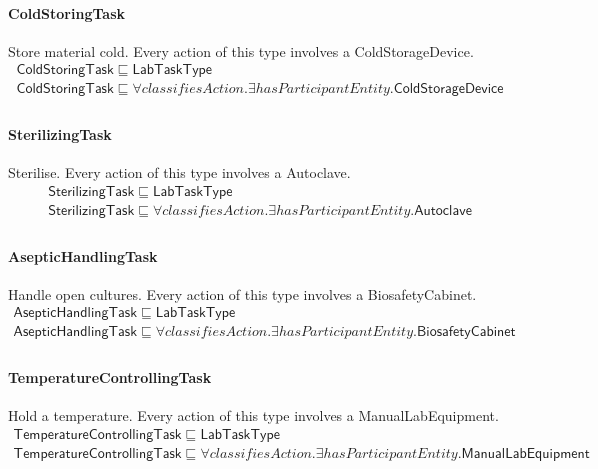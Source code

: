 \documentclass[10pt]{article}
\begin{document}
\paragraph{ColdStoringTask} Store material cold. Every action of this type involves a ColdStorageDevice.
\[\begin{array}{l}
\mathsf{ColdStoringTask} \sqsubseteq  \mathsf{LabTaskType} \\
\mathsf{ColdStoringTask} \sqsubseteq  \forall \mathit{classifiesAction}.\exists \mathit{hasParticipantEntity}.\mathsf{ColdStorageDevice} \\
\end{array}\]
\paragraph{SterilizingTask} Sterilise. Every action of this type involves a Autoclave.
\[\begin{array}{l}
\mathsf{SterilizingTask} \sqsubseteq  \mathsf{LabTaskType} \\
\mathsf{SterilizingTask} \sqsubseteq  \forall \mathit{classifiesAction}.\exists \mathit{hasParticipantEntity}.\mathsf{Autoclave} \\
\end{array}\]
\paragraph{AsepticHandlingTask} Handle open cultures. Every action of this type involves a BiosafetyCabinet.
\[\begin{array}{l}
\mathsf{AsepticHandlingTask} \sqsubseteq  \mathsf{LabTaskType} \\
\mathsf{AsepticHandlingTask} \sqsubseteq  \forall \mathit{classifiesAction}.\exists \mathit{hasParticipantEntity}.\mathsf{BiosafetyCabinet} \\
\end{array}\]
\paragraph{TemperatureControllingTask} Hold a temperature. Every action of this type involves a ManualLabEquipment.
\[\begin{array}{l}
\mathsf{TemperatureControllingTask} \sqsubseteq  \mathsf{LabTaskType} \\
\mathsf{TemperatureControllingTask} \sqsubseteq  \forall \mathit{classifiesAction}.\exists \mathit{hasParticipantEntity}.\mathsf{ManualLabEquipment} \\
\end{array}\]
\end{document}
